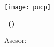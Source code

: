 \begin{titlepage}
    \centering
    \vspace*{0.5cm}
    {\Huge\bfseries \college \par}
    \vspace{1cm}
    {\Large\bfseries \faculty \par}
    \vspace{0.6cm}
    \texttt{[image: pucp]}
    \vspace{0.6cm}

    {\Large\bfseries \textit \topic \par}
    \vspace{1.5cm}
    {\large\bfseries \courseTitle\ (\courseCode) \par}
    {\bfseries \numberReport \par}
    \vspace{1cm}
    \large\authors
    \vspace{1cm}

    Asesor:

    \large\advisor
    \vspace{1cm}

    { \noteDate \par}
    \vfill
\end{titlepage}

